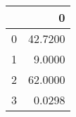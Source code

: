 \begin{tabular}{lr}
\toprule
{} &        0 \\
\midrule
0 &  42.7200 \\
1 &   9.0000 \\
2 &  62.0000 \\
3 &   0.0298 \\
\bottomrule
\end{tabular}

